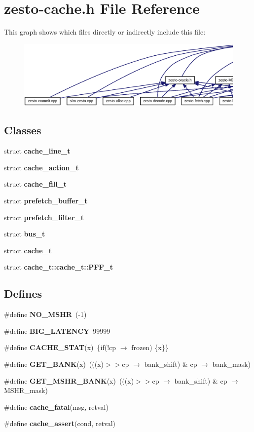 \section{zesto-cache.h File Reference}
\label{zesto-cache_8h}


This graph shows which files directly or indirectly include this file:\nopagebreak
\begin{figure}[H]
\begin{center}
\leavevmode
\includegraphics[width=420pt]{zesto-cache_8h__dep__incl}
\end{center}
\end{figure}
\subsection*{Classes}
\begin{CompactItemize}
\item 
struct {\bf cache\_\-line\_\-t}
\item 
struct {\bf cache\_\-action\_\-t}
\item 
struct {\bf cache\_\-fill\_\-t}
\item 
struct {\bf prefetch\_\-buffer\_\-t}
\item 
struct {\bf prefetch\_\-filter\_\-t}
\item 
struct {\bf bus\_\-t}
\item 
struct {\bf cache\_\-t}
\item 
struct {\bf cache\_\-t::cache\_\-t::PFF\_\-t}
\end{CompactItemize}
\subsection*{Defines}
\begin{CompactItemize}
\item 
\#define {\bf NO\_\-MSHR}~(-1)
\item 
\#define {\bf BIG\_\-LATENCY}~99999
\item 
\#define {\bf CACHE\_\-STAT}(x)~\{if(!cp $\rightarrow$ frozen) \{x\}\}
\item 
\#define {\bf GET\_\-BANK}(x)~(((x)$>$$>$cp $\rightarrow$ bank\_\-shift) \& cp $\rightarrow$ bank\_\-mask)
\item 
\#define {\bf GET\_\-MSHR\_\-BANK}(x)~(((x)$>$$>$cp $\rightarrow$ bank\_\-shift) \& cp $\rightarrow$ MSHR\_\-mask)
\item 
\#define {\bf cache\_\-fatal}(msg, retval)
\item 
\#define {\bf cache\_\-assert}(cond, retval)
\end{CompactItemize}
